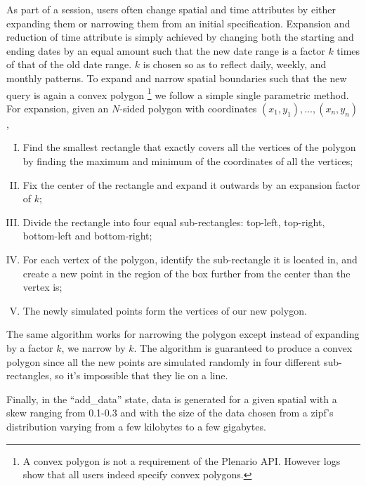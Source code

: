 \documentclass[11pt]{article}
\begin{document}
As part of a session, users often change spatial and time attributes by either expanding them or narrowing them from an initial specification. Expansion and reduction of time attribute is simply achieved by changing both the starting and ending dates by an equal amount such that the new date range is a factor $k$ times of that of the old date range. $k$ is chosen so as to reflect daily, weekly, and monthly patterns. To expand and narrow spatial boundaries such that the new query is again a convex polygon \footnote{A convex polygon is not a requirement of the Plenario API. However logs show that all users indeed specify convex polygons.} we follow a simple single parametric method. For expansion, given an $N$-sided polygon with coordinates $(x_1,y_1),\ldots,(x_n, y_n)$,
\begin{enumerate}[I.]
\itemsep0em 
 \item Find the smallest rectangle that exactly covers all the vertices of the polygon by finding the maximum and minimum of the coordinates of all the vertices; 
 \item Fix the center of the rectangle and expand it outwards by an expansion factor of $k$; 
 \item Divide the rectangle into four equal sub-rectangles: top-left, top-right, bottom-left and bottom-right; 
 \item For each vertex of the polygon, identify the sub-rectangle it is located in, and create a new point in the region of the box further from the center than the vertex is;
 \item The newly simulated points form the vertices of our new polygon. 
 \end{enumerate}
 The same algorithm works for narrowing the polygon except instead of expanding by a factor $k$, we narrow by $k$. The algorithm is guaranteed to produce a convex polygon since all the new points are simulated randomly in four different sub-rectangles, so it's impossible that they lie on a line.
 
Finally, in the ``add\_data'' state, data is generated for a given spatial with a skew ranging from 0.1-0.3 and with the size of the data chosen from a zipf's distribution varying from a few kilobytes to a few gigabytes.  
\end{document}
